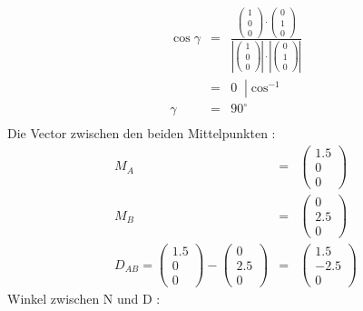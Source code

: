 \documentclass[11pt]{article}
\begin{document}
\begin{eqnarray*}
\cos \gamma &=& \frac{ 
\begin{pmatrix}
1 \\ 0 \\ 0
\end{pmatrix}
\cdot
\begin{pmatrix}
0 \\ 1 \\ 0
\end{pmatrix}
}{
\left|\begin{pmatrix}
1 \\ 0 \\ 0
\end{pmatrix}
\right|
\cdot 
\left|
\begin{pmatrix}
0 \\ 1 \\ 0
\end{pmatrix}
\right|}  \\
&=& 0 \;\; \left| \cos^{-1}\right.\\
 \gamma &=& 90^\circ  \\
\end{eqnarray*}
Die Vector zwischen den beiden Mittelpunkten :
\begin{eqnarray*}
M_A &=& \begin{pmatrix}
1.5 \\ 0 \\ 0
\end{pmatrix} \\
M_B &=& 
\begin{pmatrix}
0 \\ 2.5 \\ 0
\end{pmatrix} \\
D_{AB} =
\begin{pmatrix}
1.5 \\ 0 \\ 0
\end{pmatrix} - 
\begin{pmatrix}
0 \\ 2.5 \\ 0
\end{pmatrix}
&=&  
\begin{pmatrix}
1.5 \\ -2.5 \\ 0
\end{pmatrix}
\end{eqnarray*}
Winkel zwischen N und D :
\end{document}
